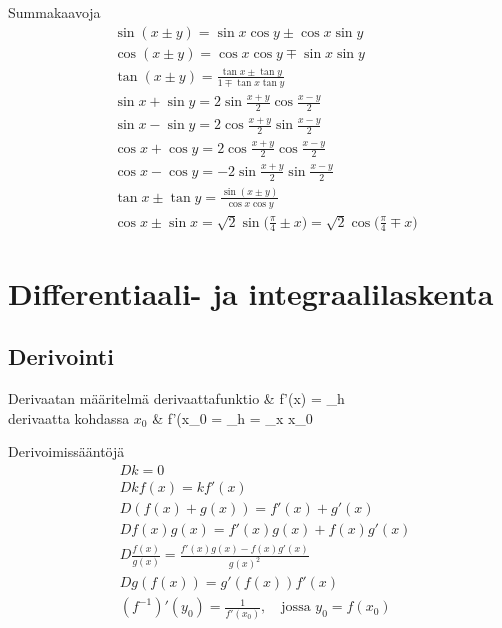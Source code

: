 Summakaavoja \cite[s. 33]{MAOL}
\begin{align*}
& \sin ( x \pm y ) = \sin x \cos y \pm \cos x \sin y \\
& \cos (x \pm y ) = \cos x \cos y \mp \sin x \sin y \\
& \tan (x \pm y ) = \frac{\tan x \pm \tan y}{1 \mp \tan x \tan y} \\
& \sin x + \sin y = 2 \sin \frac{x+y}{2} \cos \frac{x-y}{2} \\
& \sin x - \sin y = 2 \cos \frac{x+y}{2} \sin \frac{x-y}{2} \\
& \cos x + \cos y = 2 \cos \frac{x+y}{2} \cos \frac{x-y}{2} \\
& \cos x - \cos y = -2 \sin \frac{x+y}{2} \sin \frac{x-y}{2} \\
& \tan x \pm \tan y = \frac{\sin(x \pm y)}{\cos x \cos y} \\
& \cos x \pm \sin x = \sqrt{2} \sin \Big( \frac{\pi}{4} \pm x \Big) = \sqrt{2} \cos \Big( \frac{\pi}{4} \mp x \Big) 
\end{align*}

\section{Differentiaali- ja integraalilaskenta}

\subsection{Derivointi}

\begin{eqtable-full}{Derivaatan määritelmä \cite[s. 41]{MAOL} }
derivaattafunktio			& f'(x) = \lim_{h }  \\
derivaatta kohdassa $x_0$	& f'(x_0 = \lim_{h }  = \lim_{x \rightarrow x_0}  \\
\end{eqtable-full}

Derivoimissääntöjä \cite[s. 41]{MAOL}
\begin{align*}
& Dk					= 0 \\
& Dkf(x)				= kf'(x) \\
& D(f(x) + g(x))		= f'(x) + g'(x) \\
& Df(x)g(x)			= f'(x)g(x)+f(x)g'(x) \\
& D \frac{f(x)}{g(x)}	= \frac{f'(x)g(x)-f(x)g'(x)}{g(x)^2} \\
& D g(f(x))			= g'(f(x))f'(x) \\
& (f^{-1})'(y_0)		= \frac{1}{f'(x_0)}, \quad \text{jossa } y_0 = f(x_0)
\end{align*}

